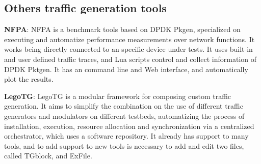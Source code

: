 \subsection{Others traffic generation tools}


\textbf{NFPA}\cite{nfpa-paper}: NFPA is a benchmark tools based on DPDK Pkgen, specialized on executing and automatize performance measurements over network functions. It works being directly connected to an specific device under tests. It uses built-in and user defined traffic traces, and Lua scripts control and collect information of DPDK Pktgen. It has an command line and Web interface, and automatically plot the results.

\textbf{LegoTG}\cite{legotg-paper}: LegoTG is a modular framework for composing custom traffic generation. It aims to simplify the combination on the use of different traffic generators and modulators on different testbeds, automatizing the process of installation, execution, resource allocation and synchronization via a centralized orchestrator, which uses a software repository. It already has support to many tools, and to add support to new tools is necessary to add and edit two files, called TGblock, and ExFile.